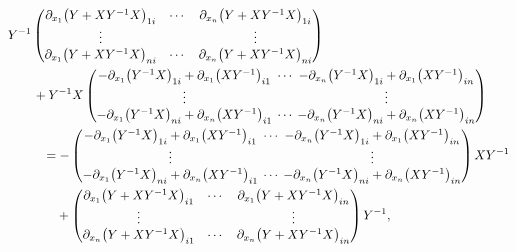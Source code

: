 \documentclass[pdftex]{sigma}
\numberwithin{equation}{section}
\begin{document}
\begin{align}
&Y^{-1}
\begin{pmatrix}
\partial_{x_1}\bigl(Y+XY^{-1}X\bigr)_{1i} & \cdots & \partial_{x_n}\bigl(Y+XY^{-1}X\bigr)_{1i} \\
\vdots & & \vdots \\
\partial_{x_1}\bigl(Y+XY^{-1}X\bigr)_{ni} & \cdots & \partial_{x_n}\bigl(Y+XY^{-1}X\bigr)_{ni}
\end{pmatrix}\nonumber \\
&\qquad+Y^{-1}X
\begin{pmatrix}
-\partial_{x_1}\bigl(Y^{-1}X\bigr)_{1i}+\partial_{x_1}\bigl(XY^{-1}\bigr)_{i1} & {\hspace*{-3mm}}\cdots{\hspace*{-3mm}} & -\partial_{x_n}\bigl(Y^{-1}X\bigr)_{1i}+\partial_{x_1}\bigl(XY^{-1}\bigr)_{in} \\
\vdots & & \vdots \\
-\partial_{x_1}\bigl(Y^{-1}X\bigr)_{ni}+\partial_{x_n}\bigl(XY^{-1}\bigr)_{i1} &{\hspace*{-3mm}} \cdots {\hspace*{-3mm}}& -\partial_{x_n}\bigl(Y^{-1}X\bigr)_{ni}+\partial_{x_n}\bigl(XY^{-1}\bigr)_{in}
\end{pmatrix}\nonumber \\
&\phantom{\qquad+}{}=-
\begin{pmatrix}
-\partial_{x_1}\bigl(Y^{-1}X\bigr)_{1i}+\partial_{x_1}\bigl(XY^{-1}\bigr)_{i1} &{\hspace*{-3mm}} \cdots {\hspace*{-3mm}}& -\partial_{x_n}\bigl(Y^{-1}X\bigr)_{1i}+\partial_{x_1}\bigl(XY^{-1}\bigr)_{in} \\
\vdots & & \vdots \\
-\partial_{x_1}\bigl(Y^{-1}X\bigr)_{ni}+\partial_{x_n}\bigl(XY^{-1}\bigr)_{i1} & {\hspace*{-3mm}}\cdots{\hspace*{-3mm}} & -\partial_{x_n}\bigl(Y^{-1}X\bigr)_{ni}+\partial_{x_n}\bigl(XY^{-1}\bigr)_{in}
\end{pmatrix}XY^{-1}\nonumber \\
&\phantom{\qquad+=}{}+
\begin{pmatrix}
\partial_{x_1}\bigl(Y+XY^{-1}X\bigr)_{i1} & \cdots & \partial_{x_1}\bigl(Y+XY^{-1}X\bigr)_{in} \\
\vdots & & \vdots \\
\partial_{x_n}\bigl(Y+XY^{-1}X\bigr)_{i1} & \cdots & \partial_{x_n}\bigl(Y+XY^{-1}X\bigr)_{in}
\end{pmatrix}
Y^{-1},\label{K6}

\end{align}
\end{document}
